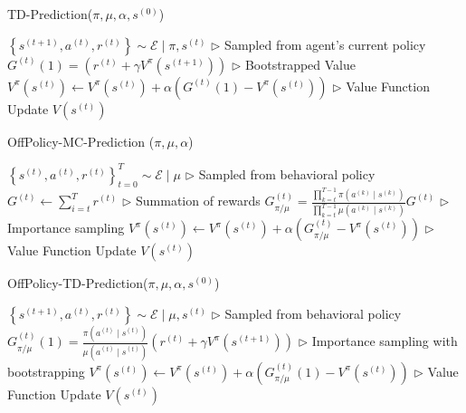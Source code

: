 \documentclass[11pt]{article}
\begin{document}
\begin{algorithm}[H]
\caption{TD-Prediction($\pi,\mu, \alpha, s^{(0)}$)}
\label{algo:TD}
\begin{algorithmic}[1]
\STATE $\left\{s^{(t+1)}, a^{(t)}, r^{(t)}\right\} \sim \mathcal{E} \mid \pi, s^{(t)}$ \hfill $\triangleright$ Sampled from agent's current policy
\STATE $G^{(t)}(1)=\left(r^{(t)}+\gamma V^{\pi}\left(s^{(t+1)}\right)\right)$ \hfill $\triangleright$ Bootstrapped Value
\STATE $V^{\pi}\left(s^{(t)}\right) \leftarrow V^{\pi}\left(s^{(t)}\right)+\alpha\left(G^{(t)}(1)-V^{\pi}\left(s^{(t)}\right)\right)$ \hfill $\triangleright$ Value Function Update
\ENDFOR
\RETURN{} $V\left(s^{(t)}\right)$
\end{algorithmic}
\end{algorithm}
\begin{algorithm}[H]
\caption{OffPolicy-MC-Prediction ($\pi,\mu, \alpha$)}
\label{algo:MC1}
\begin{algorithmic}[1]
\STATE $\left\{s^{(t)}, a^{(t)}, r^{(t)}\right\}_{t=0}^{T} \sim \mathcal{E} \mid \mu$ \hfill $\triangleright$ Sampled from behavioral policy
\STATE $G^{(t)} \leftarrow \sum_{i=t}^{T} r^{(t)}$  \hfill $\triangleright$ Summation of rewards
\STATE $G_{\pi / \mu}^{(t)}=\frac{\prod_{k=t}^{T-1} \pi\left(a^{(k)} \mid s^{(k)}\right)}{\prod_{k=t}^{T-1} \mu\left(a^{(k)} \mid s^{(k)}\right)} G^{(t)}$ \hfill $\triangleright$ Importance sampling
\STATE $V^{\pi}\left(s^{(t)}\right) \leftarrow V^{\pi}\left(s^{(t)}\right)+\alpha\left(G_{\pi / \mu}^{(t)}-V^{\pi}\left(s^{(t)}\right)\right)$ \hfill $\triangleright$ Value Function Update
\ENDFOR
\ENDFOR
\RETURN{} $V\left(s^{(t)}\right)$
\end{algorithmic}
\end{algorithm}
\begin{algorithm}[H]
\caption{OffPolicy-TD-Prediction($\pi,\mu, \alpha, s^{(0)}$)}
\label{algo:TD1}
\begin{algorithmic}[1]
\STATE $\left\{s^{(t+1)}, a^{(t)}, r^{(t)}\right\} \sim \mathcal{E} \mid \mu, s^{(t)}$ \hfill $\triangleright$ Sampled from behavioral policy
\STATE $G_{\pi / \mu}^{(t)}(1)=\frac{\pi\left(a^{(t)} \mid s^{(t)}\right)}{\mu\left(a^{(t)} \mid s^{(t)}\right)}\left(r^{(t)}+\gamma V^{\pi}\left(s^{(t+1)}\right)\right)$ \hfill  $\triangleright$ Importance sampling with bootstrapping
\STATE $V^{\pi}\left(s^{(t)}\right) \leftarrow V^{\pi}\left(s^{(t)}\right)+\alpha\left(G_{\pi / \mu}^{(t)}(1)-V^{\pi}\left(s^{(t)}\right)\right)$ \hfill $\triangleright$ Value Function Update
\ENDFOR
\RETURN{} $V\left(s^{(t)}\right)$
\end{algorithmic}
\end{algorithm}
\end{document}
